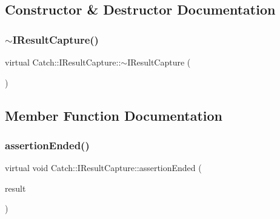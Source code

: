 \subsection{Constructor \& Destructor Documentation}
\hypertarget{struct_catch_1_1_i_result_capture_a3bd16719d6772b7470887fc36c6d0808}{}\label{struct_catch_1_1_i_result_capture_a3bd16719d6772b7470887fc36c6d0808} 
\subsubsection{\texorpdfstring{$\sim$\+I\+Result\+Capture()}{~IResultCapture()}}
{\footnotesize\ttfamily virtual Catch\+::\+I\+Result\+Capture\+::$\sim$\+I\+Result\+Capture (\begin{DoxyParamCaption}{ }\end{DoxyParamCaption})\hspace{0.3cm}{\ttfamily [virtual]}}



\subsection{Member Function Documentation}
\hypertarget{struct_catch_1_1_i_result_capture_ae45e08bccc5fb434656d4f2e44742223}{}\label{struct_catch_1_1_i_result_capture_ae45e08bccc5fb434656d4f2e44742223} 
\subsubsection{\texorpdfstring{assertion\+Ended()}{assertionEnded()}}
{\footnotesize\ttfamily virtual void Catch\+::\+I\+Result\+Capture\+::assertion\+Ended (\begin{DoxyParamCaption}\item[{\hyperlink{class_catch_1_1_assertion_result}{Assertion\+Result} const \&}]{result }\end{DoxyParamCaption})\hspace{0.3cm}{\ttfamily [pure virtual]}}

\hypertarget{struct_catch_1_1_i_result_capture_aea1617f4a84cc648246aa3ed6918b5bf}{}\label{struct_catch_1_1_i_result_capture_aea1617f4a84cc648246aa3ed6918b5bf} 
